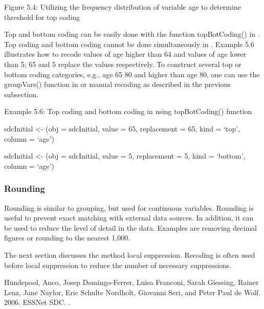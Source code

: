 \documentclass[letterpaper,10pt,english]{sphinxmanual}
\begin{document}
Figure 5.4: Utilizing the frequency distribution of variable age to
determine threshold for top coding

Top and bottom coding can be easily done with the function
topBotCoding() in . Top coding and bottom coding cannot be
done simultaneously in . Example 5.6 illustrates how to recode
values of age higher than 64 and values of age lower than 5; 65 and 5
replace the values respectively. To construct several top or bottom
coding categories, e.g., age 65 \textendash{} 80 and higher than age 80, one can use
the groupVars() function in  or manual recoding as described
in the previous subsection.

Example 5.6: Top coding and bottom coding in  using
topBotCoding() function

\begin{DUlineblock}{0em}
\item[] 
\item[] sdcInitial \textless{}- (obj = sdcInitial, value = 65,
replacement = 65, kind = ‘top’, column = ‘age’)
\item[] 
\item[] sdcInitial \textless{}- (obj = sdcInitial, value = 5,
replacement = 5, kind = ‘bottom’, column = ‘age’)
\end{DUlineblock}


\subsubsection{Rounding}
\label{\detokenize{anon_methods:rounding}}
Rounding is similar to grouping, but used for continuous variables.
Rounding is useful to prevent exact matching with external data sources.
In addition, it can be used to reduce the level of detail in the data.
Examples are removing decimal figures or rounding to the nearest 1,000.

The next section discusses the method local suppression. Recoding is
often used before local suppression to reduce the number of necessary
suppressions.


Hundepool, Anco, Josep Domingo-Ferrer, Luisa Franconi, Sarah Giessing,
Rainer Lenz, Jane Naylor, Eric Schulte Nordholt, Giovanni Seri, and
Peter Paul de Wolf. 2006. 
ESSNet SDC. .
\end{document}
